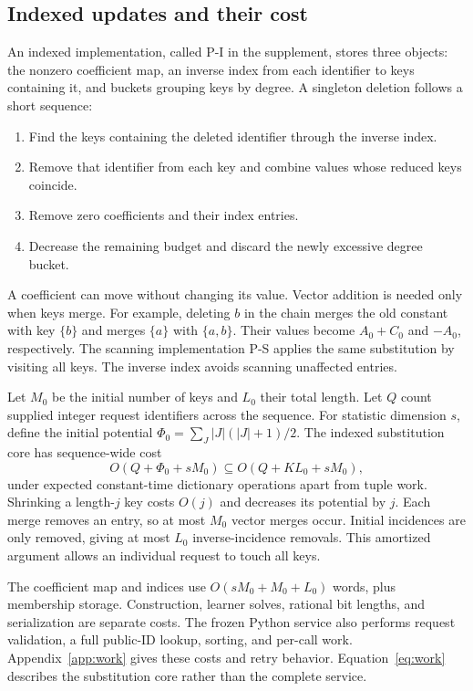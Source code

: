 \subsection{Indexed updates and their cost}\label{sec:implementation}
An indexed implementation, called P-I in the supplement, stores three
objects: the nonzero coefficient map, an inverse index from each identifier
to keys containing it, and buckets grouping keys by degree. A singleton
deletion follows a short sequence:
\begin{enumerate}
\item Find the keys containing the deleted identifier through the inverse index.
\item Remove that identifier from each key and combine values whose reduced keys coincide.
\item Remove zero coefficients and their index entries.
\item Decrease the remaining budget and discard the newly excessive degree bucket.
\end{enumerate}
A coefficient can move without changing its value. Vector addition is
needed only when keys merge. For example, deleting $b$ in the chain
merges the old constant with key $\{b\}$ and merges $\{a\}$ with
$\{a,b\}$. Their values become $A_0+C_0$ and $-A_0$, respectively.
The scanning implementation P-S applies the same substitution by visiting
all keys. The inverse index avoids scanning unaffected entries.

Let $M_0$ be the initial number of keys and $L_0$ their total length.
Let $Q$ count supplied integer request identifiers across the sequence.
For statistic dimension $s$, define the initial potential
$\Phi_0=\sum_J |J|(|J|+1)/2$. The indexed substitution core has
sequence-wide cost
\begin{equation}\label{eq:work}
 O(Q+\Phi_0+sM_0)\subseteq O(Q+K L_0+sM_0),
\end{equation}
under expected constant-time dictionary operations apart from tuple work.
Shrinking a length-$j$ key costs $O(j)$ and decreases its potential by $j$.
Each merge removes an entry, so at most $M_0$ vector merges occur.
Initial incidences are only removed, giving at most $L_0$
inverse-incidence removals. This amortized argument allows an individual
request to touch all keys.

The coefficient map and indices use $O(sM_0+M_0+L_0)$ words, plus
membership storage. Construction, learner solves, rational bit lengths,
and serialization are separate costs. The frozen Python service also
performs request validation, a full public-ID lookup, sorting, and per-call
work. Appendix~\ref{app:work} gives these costs and retry behavior.
Equation~\eqref{eq:work} describes the substitution core rather than the
complete service.

